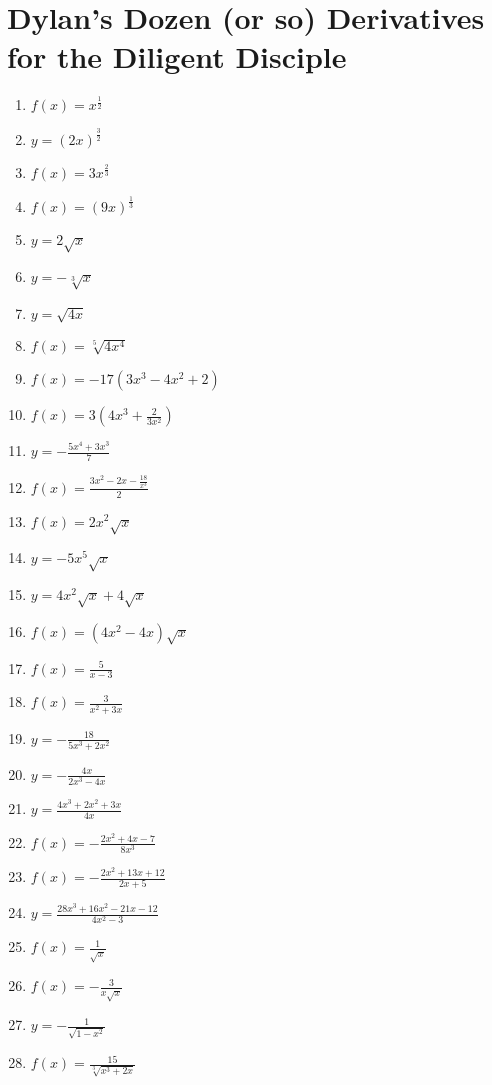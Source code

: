 \documentclass[a4paper,10pt]{article}
\begin{document}
\section*{Dylan's Dozen (or so) Derivatives for the Diligent Disciple}
\small
\begin{multicols}{3}
\begin{enumerate}
\item $f(x) = x^{\frac{1}{2}}$
\item $y = (2x)^{\frac{3}{2}}$
\item $f(x) = 3x^{\frac{2}{3}}$
\item $f(x) = (9x)^{\frac{1}{3}}$

\item $y = 2\sqrt{x}$
\item $y = -\sqrt[3]{x}$
\item $y = \sqrt{4x}$
\item $f(x) = \sqrt[5]{4x^4}$

\item $f(x) = -17(3x^3 - 4x^2 + 2)$
\item $f(x) = 3(4x^3 + \frac{2}{3x^2})$
\item $y = -\frac{5x^4 + 3x^3}{7}$
\item $f(x) = \frac{3x^2 - 2x -\frac{18}{x^3}}{2}$

\item $f(x) = 2x^2\sqrt{x}$
\item $y = -5x^5\sqrt{x}$
\item $y = 4x^2\sqrt{x} + 4\sqrt{x}$
\item $f(x) = (4x^2 - 4x)\sqrt{x}$

\item $f(x) = \frac{5}{x - 3}$
\item $f(x) = \frac{3}{x^2 + 3x}$
\item $y = -\frac{18}{5x^3 + 2x^2}$
\item $y = -\frac{4x}{2x^3 - 4x}$

\item $y = \frac{4x^3 + 2x^2 + 3x}{4x}$
\item $f(x) = -\frac{2x^2 + 4x - 7}{8x^3}$
\item $f(x) = -\frac{2x^2 + 13x + 12}{2x + 5}$
\item $y = \frac{28x^3 + 16x^2 - 21x - 12}{4x^2 - 3}$

\item $f(x) = \frac{1}{\sqrt{x}}$
\item $f(x) = -\frac{3}{x\sqrt{x}}$
\item $y = -\frac{1}{\sqrt{1 - x^2}}$
\item $f(x) = \frac{15}{\sqrt[3]{x^3 + 2x}}$


\end{enumerate}
\end{multicols}
\end{document}
